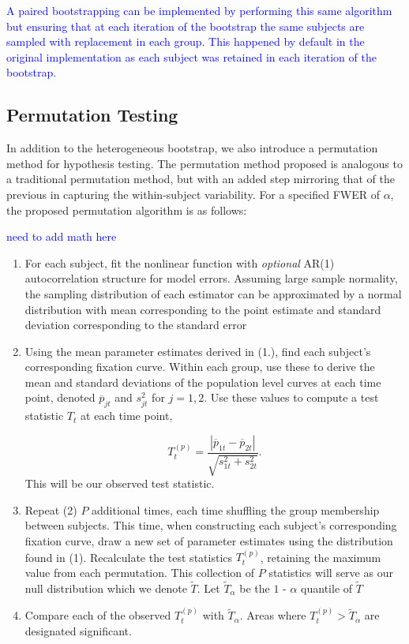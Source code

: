 \documentclass{article}
\providecommand{\cn}[1]{\textcolor{blue}{#1}}
\begin{document}
\cn{A paired bootstrapping can be implemented by performing this same algorithm but ensuring that at each iteration of the bootstrap the same subjects are sampled with replacement in each group. This happened by default in the original implementation as each subject was retained in each iteration of the bootstrap.}


\subsection{Permutation Testing}

In addition to the heterogeneous bootstrap, we also introduce a permutation method for hypothesis testing. The permutation method proposed is analogous to a traditional permutation method, but with an added step mirroring that of the previous in capturing the within-subject variability. For a specified FWER of $\alpha$, the proposed permutation algorithm is as follows:

\cn{need to add math here}

\begin{enumerate}
\vspace{-2mm}
\item For each subject, fit the nonlinear function with \textit{optional} AR(1) autocorrelation structure for model errors. Assuming large sample normality, the sampling distribution of each estimator can be approximated by a normal distribution with mean corresponding to the point estimate and standard deviation corresponding to the standard error
\item Using the mean parameter estimates derived in (1.), find each subject's corresponding fixation curve. Within each group, use these to derive the mean and standard deviations of the population level curves at each time point, denoted $\overline{p}_{jt}$ and $s_{jt}^2$ for $j = 1,2$. Use these values to compute a test statistic $T_t$ at each time point,

\begin{equation}
T_t^{(p)} = \frac{|\overline{p}_{1t} - \overline{p}_{2t}|}{\sqrt{s_{1t}^2 + s_{2t}^2}}.
\end{equation}
This will be our observed test statistic.
\item Repeat (2) $P$  additional times, each time shuffling the group membership between subjects. This time, when constructing each subject's corresponding fixation curve, draw a new set of parameter estimates using the distribution found in (1). Recalculate the test statistics $T_t^{(p)}$, retaining the maximum value from each permutation. This collection of $P$ statistics will serve as our null distribution which we denote $\widetilde{T}$. Let $\widetilde{T}_{\alpha}$ be the $1$ - $\alpha$ quantile of $\widetilde{T}$
\item Compare each of the observed $T_t^{(p)}$ with $\widetilde{T}_{\alpha}$. Areas where $T_t^{(p)} > \widetilde{T}_{\alpha}$ are designated significant. 
\end{enumerate}
\end{document}
